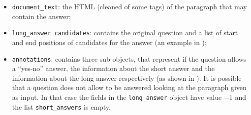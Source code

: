 \documentclass[10pt,hidelinks]{article}
\begin{document}
\begin{itemize}
	\item {\tt document\_text}: the HTML (cleaned of some tags) of the paragraph that may contain the answer;
	\item {\tt long\_answer candidates}: contains the original question and a list of start and end positions of candidates for the answer (an example in );
	\item {\tt annotations}: contains three sub-objects, that represent if the question allows a ``yes-no'' answer, the information about the short answer and the information about the long answer respectively (as shown in ). It is possible that a question does not allow to be answered looking at the paragraph given as input. In that case the fields in the \texttt{long\_answer} object have value $-1$ and the list \texttt{short\_answers} is empty.
\end{itemize}
\end{document}
